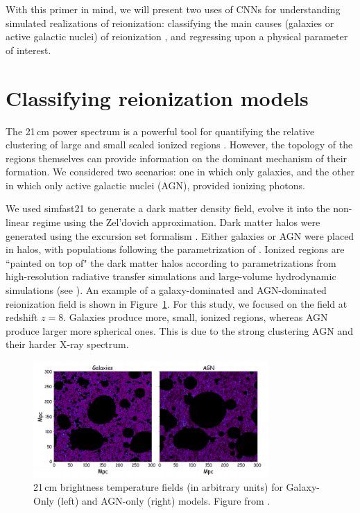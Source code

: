 With this primer in mind, we will present two uses of CNNs for understanding simulated realizations of reionization: classifying the main causes (galaxies or active galactic nuclei) of reionization \citep{Hassan.18}, and regressing upon a physical parameter of interest.

\section{Classifying reionization models}

The 21\,cm power spectrum is a powerful tool for quantifying the relative clustering of large and small scaled ionized regions \citep{Hassan.17}. However, the topology of the regions themselves can provide information on the dominant mechanism of their formation. We considered two scenarios: one in which only galaxies, and the other in which only active galactic nuclei (AGN), provided ionizing photons. 

We used {\sc simfast21} \citep{Santos.10, Hassan.17.1} to generate a dark matter density field, evolve it into the non-linear regime using the Zel'dovich approximation. Dark matter halos were generated using the excursion set formalism \citep{Bond.91}. Either galaxies or AGN were placed in halos, with populations following the parametrization of \cite{Hassan.16}. Ionized regions are ``painted on top of" the dark matter halos according to parametrizations from high-resolution radiative transfer simulations and large-volume hydrodynamic simulations (see \cite{Hassan.16, Hassan.18}). An example of a galaxy-dominated and AGN-dominated reionization field is shown in Figure~\ref{fig:hassan-fields}. For this study, we focused on the field at redshift $z=8$. Galaxies produce more, small, ionized regions, whereas AGN produce larger more spherical ones. This is due to the strong clustering AGN and their harder X-ray spectrum.

\begin{figure}
\centering
\includegraphics[width=0.8\textwidth]{chapters/hera_ml/figures/hassan-field.png}
\caption[21\,cm brightness temperature fields for Galaxy-Only and AGN-only models.]{21\,cm brightness temperature fields (in arbitrary units) for Galaxy-Only (left) and AGN-only (right) models. Figure from \cite{Hassan.18}.}
\label{fig:hassan-fields}
\end{figure}

